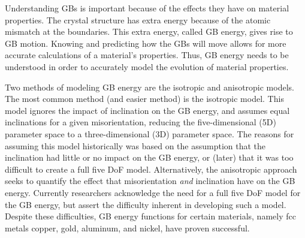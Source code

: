 \documentclass[12pt]{report}
\begin{document}
Understanding GBs is important because of the effects they have on material properties.\cite{patala2013, homer2015, bulatov2014}  The crystal structure has extra energy because of the atomic mismatch at the boundaries.  This extra energy, called GB energy, gives rise to GB motion.  Knowing and predicting how the GBs will move allows for more accurate calculations of a material's properties.  Thus, GB energy needs to be understood in order to accurately model the evolution of material properties.

Two methods of modeling GB energy are the isotropic and anisotropic models.  The most common method (and easier method) is the isotropic model.  This model ignores the impact of inclination on the GB energy, and assumes equal inclinations for a given misorientation, reducing the five-dimensional (5D) parameter space to a three-dimensional (3D) parameter space.  The reasons for assuming this model historically was based on the assumption that the inclination had little or no impact on the GB energy, or (later) that it was too difficult to create a full five DoF model.\cite{homer2015}  Alternatively, the anisotropic approach seeks to quantify the effect that misorientation \emph{and} inclination have on the GB energy.  Currently researchers acknowledge the need for a full five DoF model for the GB energy, but assert the difficulty inherent in developing such a model.\cite{rohrer2011, lejcek2010, homer2015}  Despite these difficulties, GB energy functions for certain materials, namely fcc metals copper, gold, aluminum, and nickel, have proven successful.\cite{bulatov2014}
\end{document}
